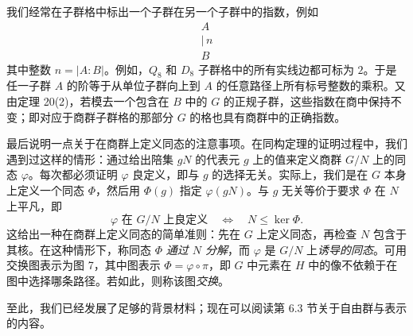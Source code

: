 我们经常在子群格中标出一个子群在另一个子群中的指数，例如
\[
\begin{array}{c}
A\\[-1mm]
|\,n\\[-1mm]
B
\end{array}
\]
其中整数 $n=|A:B|$。例如，$Q_8$ 和 $D_8$ 子群格中的所有实线边都可标为 $2$。于是任一子群 $A$ 的阶等于从单位子群向上到 $A$ 的任意路径上所有标号整数的乘积。又由定理 20(2)，若模去一个包含在 $B$ 中的 $G$ 的正规子群，这些指数在商中保持不变；即对应于商群子群格的那部分 $G$ 的格也具有商群中的正确指数。

最后说明一点关于在商群上定义同态的注意事项。在同构定理的证明过程中，我们遇到过这样的情形：通过给出陪集 $gN$ 的代表元 $g$ 上的值来定义商群 $G/N$ 上的同态 $\varphi$。每次都必须证明 $\varphi$ 良定义，即与 $g$ 的选择无关。实际上，我们是在 $G$ 本身上定义一个同态 $\Phi$，然后用 $\Phi(g)$ 指定 $\varphi(gN)$。与 $g$ 无关等价于要求 $\Phi$ 在 $N$ 上平凡，即
\[
  \varphi \text{ 在 } G/N \text{ 上良定义}
  \quad\Longleftrightarrow\quad N\leq\ker\Phi.
\]
这给出一种在商群上定义同态的简单准则：先在 $G$ 上定义同态，再检查 $N$ 包含于其核。在这种情形下，称同态 $\Phi$ \emph{通过 $N$ 分解}，而 $\varphi$ 是 $G/N$ 上\emph{诱导的同态}。可用交换图表示为图 7，其中图表示 $\Phi=\varphi\circ\pi$，即 $G$ 中元素在 $H$ 中的像不依赖于在图中选择哪条路径。若如此，则称该图\emph{交换}。

\begin{center}
\end{center}

至此，我们已经发展了足够的背景材料；现在可以阅读第 6.3 节关于自由群与表示的内容。

